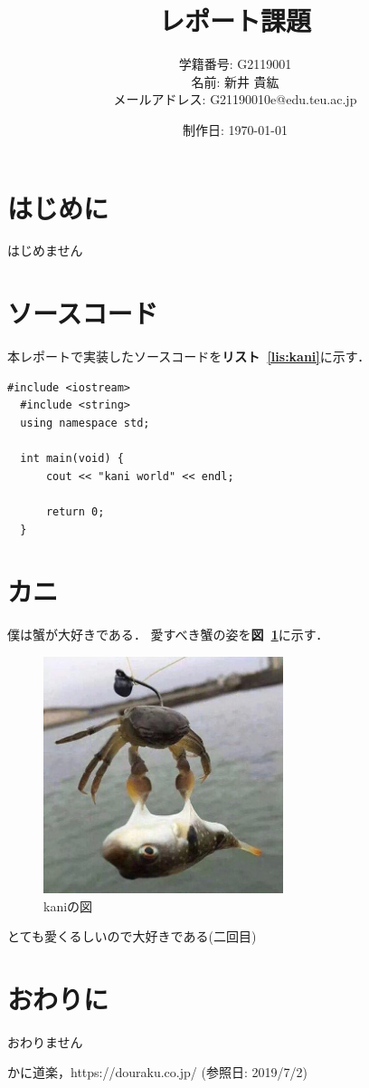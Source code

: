\documentclass[uplatex,a4j]{jsarticle}
\newcommand\figref[1]{\textbf{図~\ref{#1}}}
\newcommand\lisref[1]{\textbf{リスト~\ref{#1}}}
\begin{document}
\title{レポート課題}
\author{学籍番号: G2119001 \\ 名前: 新井 貴紘 \\ メールアドレス: G21190010e@edu.teu.ac.jp}
\date{制作日: \today}
\maketitle

\section{はじめに}
はじめません


\section{ソースコード}
本レポートで実装したソースコードを\lisref{lis:kani}に示す．

\begin{lstlisting}[caption=outputKaniWorld.cppのソースコード,label=lis:kani]
  #include <iostream>
  #include <string>
  using namespace std;
  
  int main(void) {
      cout << "kani world" << endl;
  
      return 0;
  }
\end{lstlisting}

\section{カニ}
僕は蟹が大好きである\cite{kani}．
愛すべき蟹の姿を\figref{fig:kani}に示す．

\begin{figure}[H]
  \centering
  \includegraphics[clip,width=7.0cm]{./fig/kani.JPG}
  \caption{kaniの図}
  \label{fig:kani}
\end{figure}

とても愛くるしいので大好きである(二回目)


\section{おわりに}
おわりません



\begin{thebibliography}{9}
   かに道楽，https://douraku.co.jp/ (参照日: 2019/7/2)
\end{thebibliography}
\end{document}
